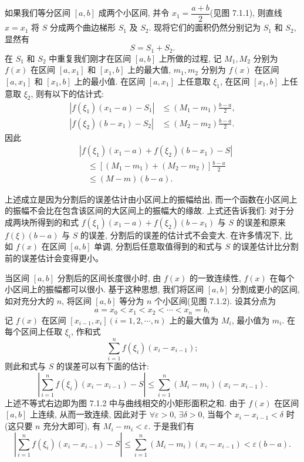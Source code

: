 \documentclass[UTF8,12pt,a4paper,fontset=fandol]{ctexart}
\begin{document}
如果我们等分区间 $[a,b]$ 成两个小区间, 并令 $x_1=\dfrac{a+b}{2}$(见图 7.1.1), 则直线 $x=x_1$ 将 $S$ 分成两个曲边梯形 $S_1$ 及 $S_2$. 现将它们的面积仍然分别记为 $S_1$ 和 $S_2$, 显然有
\[
  S=S_1+S_2.
\]
在 $S_1$ 和 $S_2$ 中重复我们刚才在区间 $[a,b]$ 上所做的过程, 记 $M_1,M_2$ 分别为 $f(x)$ 在区间 $[a,x_1]$ 和 $[x_1,b]$ 上的最大值, $m_1,m_2$ 分别为 $f(x)$ 在区间 $[a,x_1]$ 和 $[x_1,b]$ 上的最小值. 在区间 $[a,x_1]$ 上任意取 $\xi_1$, 在区间 $[x_1,b]$ 上任意取 $\xi_2$, 则有以下的估计式:
\[
\begin{aligned}
  |f(\xi_1)(x_1-a)-S_1|&\leq (M_1-m_1)\frac{b-a}{2},\\
  |f(\xi_2)(b-x_1)-S_2|&\leq (M_2-m_2)\frac{b-a}{2}.
\end{aligned}
\]
因此
\[
\begin{aligned}
  &|f(\xi_1)(x_1-a)+f(\xi_2)(b-x_1)-S|\\
  &\quad\leq [(M_1-m_1)+(M_2-m_2)]\frac{b-a}{2}\\
  &\quad\leq (M-m)(b-a).
\end{aligned}
\]

上述成立是因为分割后的误差估计由小区间上的振幅给出, 而一个函数在小区间上的振幅不会比在包含该区间的大区间上的振幅大的缘故. 上式还告诉我们: 对于分成两块所得到的和式 $f(\xi_1)(x_1-a)+f(\xi_2)(b-x_1)$ 与 $S$ 的误差和原来 $f(\xi)(b-a)$ 与 $S$ 的误差, 分割后的误差的估计式不会变大. 在许多情况下, 比如 $f(x)$ 在区间 $[a,b]$ 单调, 分割后任意取值得到的和式与 $S$ 的误差估计比分割前的误差估计会变得更小。

当区间 $[a,b]$ 分割后的区间长度很小时, 由 $f(x)$ 的一致连续性, $f(x)$ 在每个小区间上的振幅都可以很小. 基于这种思想, 我们将区间 $[a,b]$ 分割成更小的区间, 如对充分大的 $n$, 将区间 $[a,b]$ 等分为 $n$ 个小区间(见图 7.1.2). 设其分点为
\[
  a=x_0<x_1<x_2<\cdots<x_n=b,
\]
记 $f(x)$ 在区间 $[x_{i-1},x_i](i=1,2,\cdots,n)$ 上的最大值为 $M_i$, 最小值为 $m_i$. 在每个区间上任取 $\xi_i$, 作和式
\[
  \sum_{i=1}^n f(\xi_i)(x_i-x_{i-1});
\]
则此和式与 $S$ 的误差可以有下面的估计:
\begin{equation}
  \left|\sum_{i=1}^n f(\xi_i)(x_i-x_{i-1})-S\right|
  \leq \sum_{i=1}^n (M_i-m_i)(x_i-x_{i-1}).
  \tag{7.1.1}
\end{equation}
上述不等式右边即为图 7.1.2 中与曲线相交的小矩形面积之和. 由于 $f(x)$ 在区间 $[a,b]$ 上连续, 从而一致连续, 因此对于 $\forall\varepsilon>0$, $\exists\delta>0$, 当每个 $x_i-x_{i-1}<\delta$ 时(这只要 $n$ 充分大即可), 有 $M_i-m_i<\varepsilon$. 于是我们有
\[
  \left|\sum_{i=1}^n f(\xi_i)(x_i-x_{i-1})-S\right|
  \leq \sum_{i=1}^n (M_i-m_i)(x_i-x_{i-1})<\varepsilon(b-a).
\]
\end{document}

